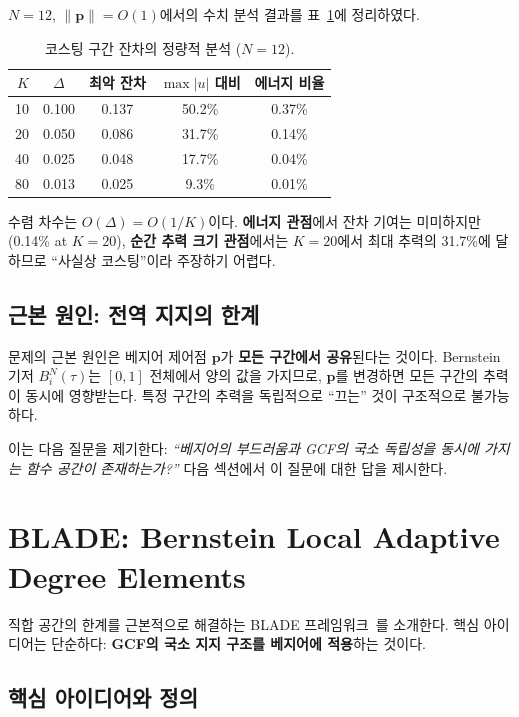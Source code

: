 \documentclass[11pt]{article}
\begin{document}
$N = 12$, $\|\mathbf{p}\| = O(1)$에서의 수치 분석 결과를
표~\ref{tab:residual}에 정리하였다.

\begin{table}[htb]
\centering
\caption{코스팅 구간 잔차의 정량적 분석 ($N = 12$).}
\label{tab:residual}
\begin{tabular}{rcccc}
\toprule
$K$ & $\Delta$ & 최악 잔차 & $\max|u|$ 대비 & 에너지 비율 \\
\midrule
10 & 0.100 & 0.137 & 50.2\% & 0.37\% \\
20 & 0.050 & 0.086 & 31.7\% & 0.14\% \\
40 & 0.025 & 0.048 & 17.7\% & 0.04\% \\
80 & 0.013 & 0.025 & 9.3\%  & 0.01\% \\
\bottomrule
\end{tabular}
\end{table}

수렴 차수는 $O(\Delta) = O(1/K)$이다.
\textbf{에너지 관점}에서 잔차 기여는 미미하지만 (0.14\% at $K{=}20$),
\textbf{순간 추력 크기 관점}에서는 $K{=}20$에서 최대 추력의 31.7\%에 달하므로
``사실상 코스팅''이라 주장하기 어렵다.

\subsection{근본 원인: 전역 지지의 한계}

문제의 근본 원인은 베지어 제어점 $\mathbf{p}$가
\textbf{모든 구간에서 공유}된다는 것이다.
Bernstein 기저 $B_i^N(\tau)$는 $[0,1]$ 전체에서 양의 값을 가지므로,
$\mathbf{p}$를 변경하면 모든 구간의 추력이 동시에 영향받는다.
특정 구간의 추력을 독립적으로 ``끄는'' 것이 구조적으로 불가능하다.

이는 다음 질문을 제기한다:
\textit{``베지어의 부드러움과 GCF의 국소 독립성을 동시에 가지는
함수 공간이 존재하는가?''}
다음 섹션에서 이 질문에 대한 답을 제시한다.


\section{BLADE: Bernstein Local Adaptive Degree Elements}
\label{sec:blade}

직합 공간의 한계를 근본적으로 해결하는 BLADE 프레임워크~\cite{efc005}를 소개한다.
핵심 아이디어는 단순하다:
\textbf{GCF의 국소 지지 구조를 베지어에 적용}하는 것이다.

\subsection{핵심 아이디어와 정의}
\end{document}
